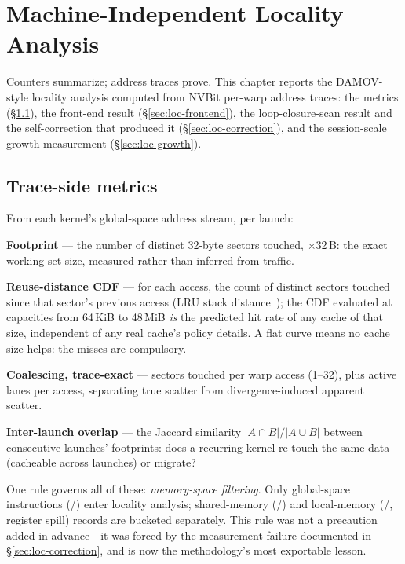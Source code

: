 \chapter{Machine-Independent Locality Analysis}
\label{ch:locality}

Counters summarize; address traces prove. This chapter reports the
DAMOV-style locality analysis computed from NVBit per-warp address traces:
the metrics (\S\ref{sec:loc-metrics}), the front-end result
(\S\ref{sec:loc-frontend}), the loop-closure-scan result and the
self-correction that produced it (\S\ref{sec:loc-correction}), and the
session-scale growth measurement (\S\ref{sec:loc-growth}).

\section{Trace-side metrics}
\label{sec:loc-metrics}

From each kernel's global-space address stream, per launch:

\textbf{Footprint} --- the number of distinct 32-byte sectors touched,
$\times$32\,B: the exact working-set size, measured rather than inferred
from traffic.

\textbf{Reuse-distance CDF} --- for each access, the count of distinct
sectors touched since that sector's previous access (LRU stack
distance~\cite{mattson1970stack}); the CDF evaluated at capacities from
64\,KiB to 48\,MiB \emph{is} the predicted hit rate of any cache of that
size, independent of any real cache's policy details. A flat curve means no
cache size helps: the misses are compulsory.

\textbf{Coalescing, trace-exact} --- sectors touched per warp access
(1--32), plus active lanes per access, separating true scatter from
divergence-induced apparent scatter.

\textbf{Inter-launch overlap} --- the Jaccard similarity
$|A \cap B|/|A \cup B|$ between consecutive launches' footprints: does a
recurring kernel re-touch the same data (cacheable across launches) or
migrate?

One rule governs all of these: \emph{memory-space filtering}. Only
global-space instructions (/) enter locality analysis;
shared-memory (/) and local-memory
(/, register spill) records are bucketed separately.
This rule was not a precaution added in advance---it was forced by the
measurement failure documented in \S\ref{sec:loc-correction}, and is now the
methodology's most exportable lesson.


